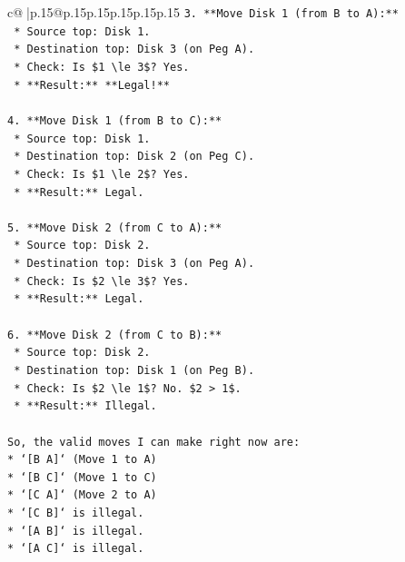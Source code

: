 \documentclass{article}
\begin{document}
{\begin{supertabular}{c@{$\;$}|p{.15\linewidth}@{}p{.15\linewidth}p{.15\linewidth}p{.15\linewidth}p{.15\linewidth}p{.15\linewidth}}
{{{\texttt{3.  **Move Disk 1 (from B to A):**} \\
\texttt{    *   Source top: Disk 1.} \\
\texttt{    *   Destination top: Disk 3 (on Peg A).} \\
\texttt{    *   Check: Is \$1 \textbackslash{}le 3\$? Yes.} \\
\texttt{    *   **Result:** **Legal!**} \\
\\ 
\texttt{4.  **Move Disk 1 (from B to C):**} \\
\texttt{    *   Source top: Disk 1.} \\
\texttt{    *   Destination top: Disk 2 (on Peg C).} \\
\texttt{    *   Check: Is \$1 \textbackslash{}le 2\$? Yes.} \\
\texttt{    *   **Result:** Legal.} \\
\\ 
\texttt{5.  **Move Disk 2 (from C to A):**} \\
\texttt{    *   Source top: Disk 2.} \\
\texttt{    *   Destination top: Disk 3 (on Peg A).} \\
\texttt{    *   Check: Is \$2 \textbackslash{}le 3\$? Yes.} \\
\texttt{    *   **Result:** Legal.} \\
\\ 
\texttt{6.  **Move Disk 2 (from C to B):**} \\
\texttt{    *   Source top: Disk 2.} \\
\texttt{    *   Destination top: Disk 1 (on Peg B).} \\
\texttt{    *   Check: Is \$2 \textbackslash{}le 1\$? No. \$2 > 1\$.} \\
\texttt{    *   **Result:** Illegal.} \\
\\ 
\texttt{So, the valid moves I can make right now are:} \\
\texttt{*   `{[}B A{]}` (Move 1 to A)} \\
\texttt{*   `{[}B C{]}` (Move 1 to C)} \\
\texttt{*   `{[}C A{]}` (Move 2 to A)} \\
\texttt{*   `{[}C B{]}` is illegal.} \\
\texttt{*   `{[}A B{]}` is illegal.} \\
\texttt{*   `{[}A C{]}` is illegal.} \\
\\ 
}}}
\end{supertabular}}
\end{document}
